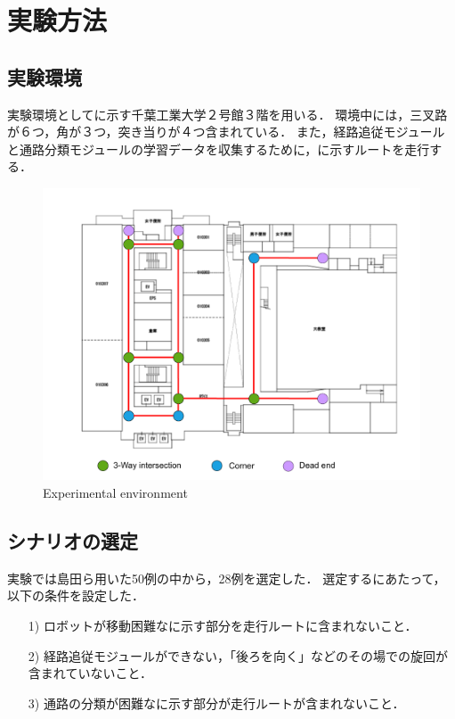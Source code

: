 \newpage
\section{実験方法}
\subsection{実験環境}
実験環境としてに示す千葉工業大学２号館３階を用いる．
環境中には，三叉路が６つ，角が３つ，突き当りが４つ含まれている．
また，経路追従モジュールと通路分類モジュールの学習データを収集するために，\figref{}に示すルートを走行する．

\begin{figure}[htbp]
  \centering
  \includegraphics[width=130mm]{images/pdf/ishiguro/topo.pdf}
  \caption{Experimental environment}
  \label{fig:topo}
\end{figure}

\subsection{シナリオの選定}
実験では島田ら用いた50例の中から，28例を選定した．
選定するにあたって，以下の条件を設定した．

\begin{enumerate}
  \item [1)] ロボットが移動困難なに示す部分を走行ルートに含まれないこと．
  \item [2)] 経路追従モジュールができない，「後ろを向く」などのその場での旋回が含まれていないこと．
  \item [3)] 通路の分類が困難なに示す部分が走行ルートが含まれないこと．
\end{enumerate}

